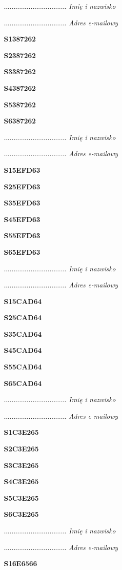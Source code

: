 .................................
\textit{Imię i nazwisko}

.................................
\textit{Adres e-mailowy}

\Large \textbf{S1387262}

\Large \textbf{S2387262}

\Large \textbf{S3387262}

\Large \textbf{S4387262}

\Large \textbf{S5387262}

\Large \textbf{S6387262}

.................................
\textit{Imię i nazwisko}

.................................
\textit{Adres e-mailowy}

\Large \textbf{S15EFD63}

\Large \textbf{S25EFD63}

\Large \textbf{S35EFD63}

\Large \textbf{S45EFD63}

\Large \textbf{S55EFD63}

\Large \textbf{S65EFD63}

.................................
\textit{Imię i nazwisko}

.................................
\textit{Adres e-mailowy}

\Large \textbf{S15CAD64}

\Large \textbf{S25CAD64}

\Large \textbf{S35CAD64}

\Large \textbf{S45CAD64}

\Large \textbf{S55CAD64}

\Large \textbf{S65CAD64}

.................................
\textit{Imię i nazwisko}

.................................
\textit{Adres e-mailowy}

\Large \textbf{S1C3E265}

\Large \textbf{S2C3E265}

\Large \textbf{S3C3E265}

\Large \textbf{S4C3E265}

\Large \textbf{S5C3E265}

\Large \textbf{S6C3E265}

.................................
\textit{Imię i nazwisko}

.................................
\textit{Adres e-mailowy}

\Large \textbf{S16E6566}

